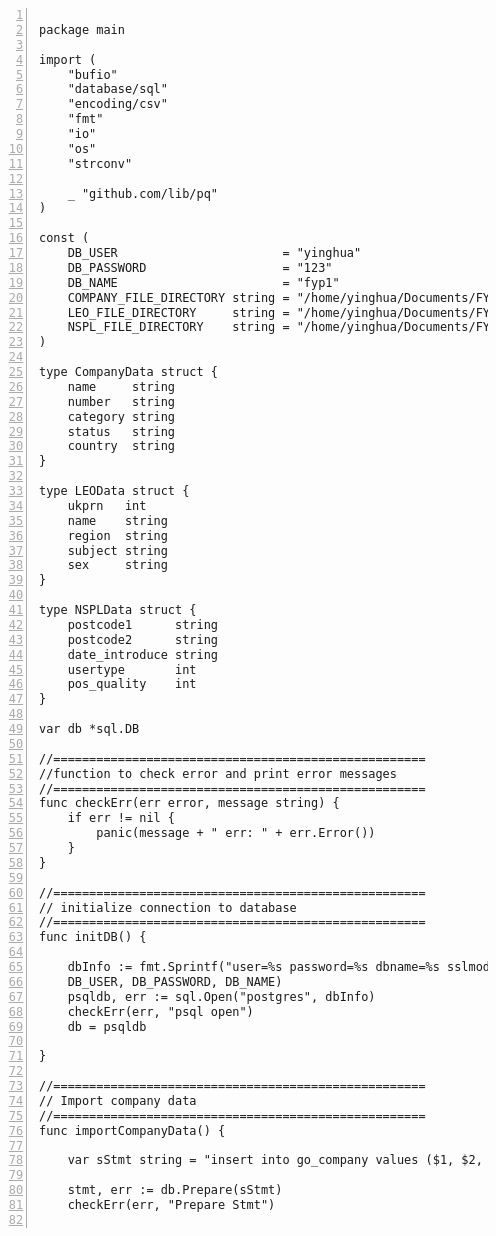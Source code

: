 \lstset{basicstyle=\ttfamily\tiny} 
\begin{lstlisting}[breaklines, frame=single, numbers=left, caption={Source code of Go program}, label=commandline-02]

package main

import (
	"bufio"
	"database/sql"
	"encoding/csv"
	"fmt"
	"io"
	"os"
	"strconv"
	
	_ "github.com/lib/pq"
)

const (
	DB_USER                       = "yinghua"
	DB_PASSWORD                   = "123"
	DB_NAME                       = "fyp1"
	COMPANY_FILE_DIRECTORY string = "/home/yinghua/Documents/FYP-data/company-data/company-data-full.csv"
	LEO_FILE_DIRECTORY     string = "/home/yinghua/Documents/FYP-data/subject-data/institution-subject-data.csv"
	NSPL_FILE_DIRECTORY    string = "/home/yinghua/Documents/FYP-data/postcode-data/UK-NSPL.csv"
)

type CompanyData struct {
	name     string
	number   string
	category string
	status   string
	country  string
}

type LEOData struct {
	ukprn   int
	name    string
	region  string
	subject string
	sex     string
}

type NSPLData struct {
	postcode1      string
	postcode2      string
	date_introduce string
	usertype       int
	pos_quality    int
}

var db *sql.DB

//====================================================
//function to check error and print error messages
//====================================================
func checkErr(err error, message string) {
	if err != nil {
		panic(message + " err: " + err.Error())
	}
}

//====================================================
// initialize connection to database
//====================================================
func initDB() {

	dbInfo := fmt.Sprintf("user=%s password=%s dbname=%s sslmode=disable",
	DB_USER, DB_PASSWORD, DB_NAME)
	psqldb, err := sql.Open("postgres", dbInfo)
	checkErr(err, "psql open")
	db = psqldb

}

//====================================================
// Import company data
//====================================================
func importCompanyData() {

	var sStmt string = "insert into go_company values ($1, $2, $3, $4, $5)"
	
	stmt, err := db.Prepare(sStmt)
	checkErr(err, "Prepare Stmt")
	

\end{lstlisting}
